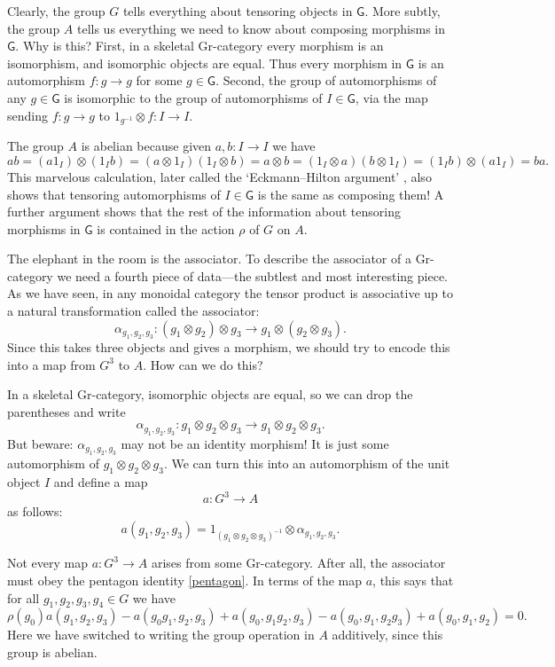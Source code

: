 \documentclass[reqno]{amsart}
\newcommand{\maps}{\colon}    %
\newcommand{\G}{{\mathsf{G}}}   %
\theoremstyle{definition}
\newcommand{\be}{\begin{equation}}
\newcommand{\ee}{\end{equation}}
\begin{document}
Clearly, the group $G$ tells everything about tensoring objects in $\G$.  More subtly, the group $A$ tells us everything we need to know about composing morphisms in $\G$.  Why is this?  First, in a skeletal Gr-category every morphism is an isomorphism, and isomorphic objects are equal.  Thus every morphism in $\G$ is an automorphism $f \maps g \to g$ for some $g \in \G$.   Second, the group of automorphisms of any $g \in \G$ is 
isomorphic to the group of automorphisms of $I \in \G$, via the map sending $f \maps g \to g$ to $1_{g^{-1}} \otimes f \maps I \to I$.  

The group $A$ is abelian because given $a, b \maps I \to I$ we have
\[   ab =  (a 1_I) \otimes (1_I b) = (a \otimes 1_I)(1_I \otimes b) = a \otimes b = (1_I \otimes a)(b \otimes 1_I) = (1_I b) \otimes (a 1_I) = ba   .\]
This marvelous calculation, later called the `Eckmann--Hilton argument' \cite{EH62},
also shows that tensoring automorphisms of $I \in \G$ is the same as composing them!  A further argument shows that the rest of the information about tensoring morphisms in $\G$ is contained in the action $\rho$ of $G$ on $A$.

The elephant in the room is the associator.  To describe the associator of a Gr-category
we need a fourth piece of data---the subtlest and most interesting piece.   As we have seen, in any monoidal category the tensor product is associative up to a natural transformation called the associator:
\[    \alpha_{g_1, g_2, g_3} \maps (g_1 \otimes g_2) \otimes g_3 \to g_1 \otimes (g_2 \otimes g_3).  \]
Since this takes three objects and gives a morphism, we should try to encode this into a
map from $G^3$ to $A$.  How can we do this?

In a skeletal Gr-category, isomorphic objects are equal, so we can drop the parentheses and write
\[    \alpha_{g_1, g_2, g_3} \maps g_1 \otimes g_2 \otimes g_3 \to g_1 \otimes g_2 \otimes g_3 .\]
But beware: $\alpha_{g_1,g_2,g_3}$ may not be an identity morphism!  It is just some automorphism of $ g_1 \otimes g_2 \otimes g_3$.  We can turn this into an automorphism of the unit object $I$ and define a map
\[  a \maps G^3 \to A \]
as follows:
\[    a(g_1, g_2, g_3) = 1_{(g_1 \otimes g_2 \otimes g_3)^{-1}} \otimes \alpha_{g_1, g_2, g_3} .\]

Not every map $a \maps G^3 \to A$ arises from some Gr-category.  After all, the associator must obey the pentagon identity \eqref{pentagon}.   In terms of the map $a$, this says that for all $g_1, g_2, g_3, g_4 \in G$ we have
\be
  \rho(g_0)a(g_1,g_2,g_3) - a(g_0g_1, g_2, g_3) +  
  a(g_0, g_1g_2, g_3) - a(g_0, g_1, g_2g_3) +
  a(g_0, g_1, g_2) = 0.
\label{3-cocycle}
\ee
Here we have switched to writing the group operation in $A$ additively, since this group is abelian.
\end{document}
